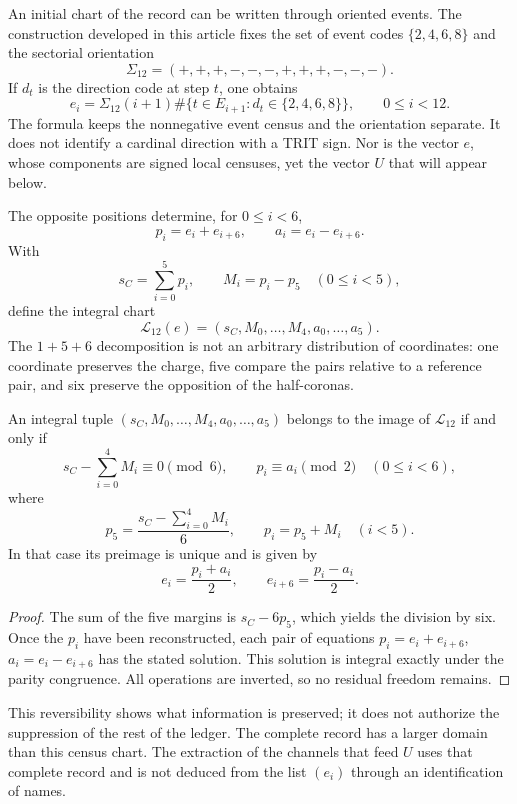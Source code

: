 An initial chart of the record can be written through oriented events. The
construction developed in this article fixes the set of event codes
\(\{2,4,6,8\}\) and the sectorial orientation
\[
 \Sigma_{12}=(+,+,+,-,-,-,+,+,+,-,-,-).
\]
If \(d_t\) is the direction code at step \(t\), one obtains
\[
 e_i=\Sigma_{12}(i+1)
 \#\{t\in E_{i+1}:d_t\in\{2,4,6,8\}\},
 \qquad0\leq i<12.
\]
The formula keeps the nonnegative event census and the orientation separate.
It does not identify a cardinal direction with a TRIT sign. Nor is the vector
\(e\), whose components are signed local censuses, yet the vector \(U\) that
will appear below.

The opposite positions determine, for \(0\leq i<6\),
\[
 p_i=e_i+e_{i+6},\qquad a_i=e_i-e_{i+6}.
\]
With
\[
 s_C=\sum_{i=0}^{5}p_i,\qquad M_i=p_i-p_5\quad(0\leq i<5),
\]
define the integral chart
\[
 \mathcal L_{12}(e)
 =(s_C,M_0,\ldots,M_4,a_0,\ldots,a_5).
\]
The \(1+5+6\) decomposition is not an arbitrary distribution of coordinates:
one coordinate preserves the charge, five compare the pairs relative to a
reference pair, and six preserve the opposition of the half-coronas.

\begin{lemma}
\label{lem:k-carta-integral}
An integral tuple \((s_C,M_0,\ldots,M_4,a_0,\ldots,a_5)\) belongs to the
image of \(\mathcal L_{12}\) if and only if
\[
 s_C-\sum_{i=0}^{4}M_i\equiv0\pmod6,
 \qquad p_i\equiv a_i\pmod2\quad(0\leq i<6),
\]
where
\[
 p_5=\frac{s_C-\sum_{i=0}^{4}M_i}{6},\qquad p_i=p_5+M_i\quad(i<5).
\]
In that case its preimage is unique and is given by
\[
 e_i=\frac{p_i+a_i}{2},\qquad e_{i+6}=\frac{p_i-a_i}{2}.
\]
\end{lemma}

\begin{proof}
The sum of the five margins is \(s_C-6p_5\), which yields the division by
six. Once the \(p_i\) have been reconstructed, each pair of equations
\(p_i=e_i+e_{i+6}\), \(a_i=e_i-e_{i+6}\) has the stated solution. This
solution is integral exactly under the parity congruence. All operations are
inverted, so no residual freedom remains.
\end{proof}

This reversibility shows what information is preserved; it does not authorize
the suppression of the rest of the ledger. The complete record has a larger
domain than this census chart. The extraction of the channels that feed
\(U\) uses that complete record and is not deduced from the list \((e_i)\)
through an identification of names.


